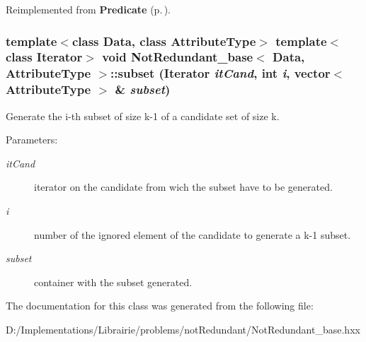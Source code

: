 Reimplemented from {\bf Predicate} {\rm (p.\,\pageref{class_predicate_6fb1a75dba2268f75738f335f403e46c})}.
\subsubsection{\setlength{\rightskip}{0pt plus 5cm}template$<$class Data, class Attribute\-Type$>$ template$<$class Iterator$>$ void {\bf Not\-Redundant\_\-base}$<$ Data, Attribute\-Type $>$::subset (Iterator {\em it\-Cand}, int {\em i}, vector$<$ Attribute\-Type $>$ \& {\em subset})\hspace{0.3cm}{\tt  [protected]}}\label{class_not_redundant__base_e762398d92f03aadce4393a33dd7bc95}


Generate the i-th subset of size k-1 of a candidate set of size k. 

\begin{Desc}
\item[Parameters:]
\begin{description}
\item[{\em it\-Cand}]iterator on the candidate from wich the subset have to be generated. \item[{\em i}]number of the ignored element of the candidate to generate a k-1 subset. \item[{\em subset}]container with the subset generated. \end{description}
\end{Desc}


The documentation for this class was generated from the following file:\begin{CompactItemize}
\item 
D:/Implementations/Librairie/problems/not\-Redundant/Not\-Redundant\_\-base.hxx\end{CompactItemize}

